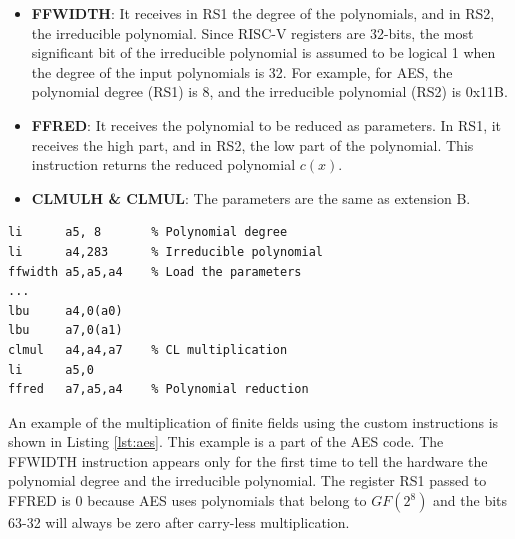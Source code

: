\begin{itemize}
    \item \textbf{FFWIDTH}: It receives in RS1 the degree of the polynomials, and in RS2, the irreducible polynomial. Since RISC-V registers are 32-bits, 
    the most significant bit of the irreducible polynomial is assumed to be logical 1 when the degree of the input polynomials is 32. For example, for AES, 
    the polynomial degree (RS1) is 8, and the irreducible polynomial (RS2) is 0x11B.
    \item \textbf{FFRED}: It receives the polynomial to be reduced as parameters. In RS1, it receives the high part, and in RS2, the low part of the polynomial. 
    This instruction returns the reduced polynomial $c(x)$. 
    \item \textbf{CLMULH \& CLMUL}: The parameters are the same as extension B.
\end{itemize}

\begin{lstlisting}[caption={GF multiplication for AES},captionpos=b,label={lst:aes}]
li	    a5, 8       % Polynomial degree
li	    a4,283      % Irreducible polynomial
ffwidth	a5,a5,a4    % Load the parameters
...
lbu	    a4,0(a0)
lbu	    a7,0(a1)
clmul	a4,a4,a7    % CL multiplication
li	    a5,0
ffred	a7,a5,a4    % Polynomial reduction
\end{lstlisting}

An example of the multiplication of finite fields using the custom instructions is shown in Listing \ref{lst:aes}. 
This example is a part of the AES code. The FFWIDTH instruction appears only for the first time to tell the hardware 
the polynomial degree and the irreducible polynomial. 
The register RS1 passed to FFRED is 0 because AES uses polynomials that belong to $GF(2^8)$ 
and the bits 63-32 will always be zero after carry-less multiplication.

